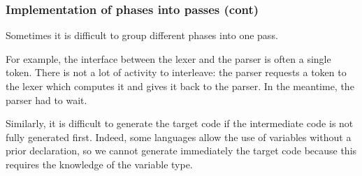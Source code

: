 %
\begin{frame}
\frametitle{Implementation of phases into passes (cont)}

Sometimes it is difficult to group different phases into one pass.

\bigskip

For example, the interface between the lexer and the parser is often a
single token. There is not a lot of activity to interleave: the
parser requests a token to the lexer which computes it and gives it
back to the parser. In the meantime, the parser had to wait.

\bigskip

Similarly, it is difficult to generate the target code if the
intermediate code is not fully generated first. Indeed, some languages
allow the use of variables without a prior declaration, so we cannot
generate immediately the target code because this requires the
knowledge of the variable type.

\end{frame}
